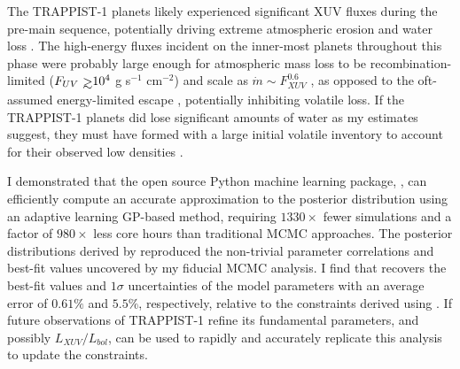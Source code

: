 The TRAPPIST-1 planets likely experienced significant XUV fluxes during the pre-main sequence, potentially driving extreme atmospheric erosion and water loss \citep{Bolmont2017,Bourrier2017a}. The high-energy fluxes incident on the inner-most planets throughout this phase were probably large enough for atmospheric mass loss to be recombination-limited ($F_{UV} \gsim 10^4$ g s$^{-1}$ cm$^{-2}$) and scale as $\dot{m} \sim F_{XUV}^{0.6}$ \citep{MurrayClay2009}, as opposed to the oft-assumed energy-limited escape \citep[$\dot{m} \sim F_{XUV}$,][]{Watson1981,Lammer2003}, potentially inhibiting volatile loss. If the TRAPPIST-1 planets did lose significant amounts of water as my estimates suggest, they must have formed with a large initial volatile inventory to account for their observed low densities \citep{Grimm2018}.

I demonstrated that the open source Python machine learning package, \approxposterior \citep{FlemingVanderPlas2018}, can efficiently compute an accurate approximation to the posterior distribution using an adaptive learning GP-based method, requiring $1330\times$ fewer \vplanet simulations and a factor of $980\times$ less core hours than traditional MCMC approaches. The posterior distributions derived by \approxposterior reproduced the non-trivial parameter correlations and best-fit values uncovered by my fiducial MCMC analysis. I find that \approxposterior recovers the best-fit values and $1\sigma$ uncertainties of the model parameters with an average error of $0.61\%$ and $5.5\%$, respectively, relative to the constraints derived using \emcee. If future observations of TRAPPIST-1 refine its fundamental parameters, and possibly $L_{XUV}/L_{bol}$, \approxposterior can be used to rapidly and accurately replicate this analysis to update the constraints.  


